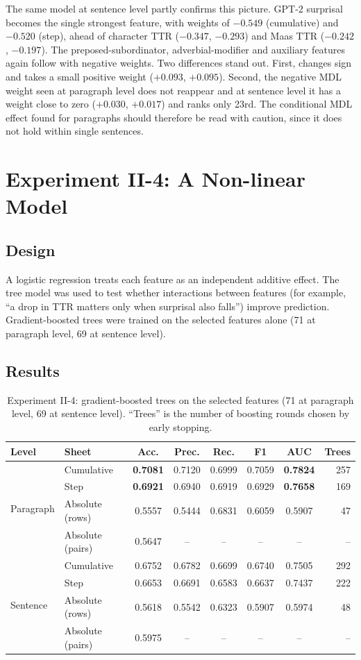 \documentclass[12pt,a4paper,oneside]{report}
\newcommand{\feat}[1]{\texttt{\detokenize{#1}}}
\begin{document}
The same model at sentence level partly confirms this picture. GPT-2 surprisal becomes the single strongest feature, with weights of $-0.549$ (cumulative) and $-0.520$ (step), ahead of character TTR ($-0.347$, $-0.293$) and Maas TTR ($-0.242$, $-0.197$). The preposed-subordinator, adverbial-modifier and auxiliary features again follow with negative weights. Two differences stand out. First, \feat{word_ttr} changes sign and takes a small positive weight ($+0.093$, $+0.095$). Second, the negative MDL weight seen at paragraph level does not reappear and at sentence level \feat{mean_mdl} it has a weight close to zero ($+0.030$, $+0.017$) and ranks only 23rd. The conditional MDL effect found for paragraphs should therefore be read with caution, since it does not hold within single sentences.

\section{Experiment II-4: A Non-linear Model}
\subsection{Design}
A logistic regression treats each feature as an independent additive effect. The tree model was used to test whether interactions between features (for example, ``a drop in TTR matters only when surprisal also falls'') improve prediction. Gradient-boosted trees were trained on the selected features alone (71 at paragraph level, 69 at sentence level).

\subsection{Results}
\begin{table}[ht]
\centering
\small
\caption[Experiment II-4: gradient-boosted trees]{Experiment II-4: gradient-boosted trees on the selected features (71 at paragraph level, 69 at sentence level). ``Trees'' is the number of boosting rounds chosen by early stopping.}
\label{tab:exp4}
\begin{tabular}{@{}llcccccr@{}}
\toprule
Level & Sheet & Acc. & Prec. & Rec. & F1 & AUC & Trees\\
\midrule
\multirow{4}{*}{Paragraph} & Cumulative & \textbf{0.7081} & 0.7120 & 0.6999 & 0.7059 & \textbf{0.7824} & 257\\
 & Step & \textbf{0.6921} & 0.6940 & 0.6919 & 0.6929 & \textbf{0.7658} & 169\\
 & Absolute (rows) & 0.5557 & 0.5444 & 0.6831 & 0.6059 & 0.5907 & 47\\
 & Absolute (pairs) & 0.5647 & -- & -- & -- & -- & --\\
\midrule
\multirow{4}{*}{Sentence} & Cumulative & 0.6752 & 0.6782 & 0.6699 & 0.6740 & 0.7505 & 292\\
 & Step & 0.6653 & 0.6691 & 0.6583 & 0.6637 & 0.7437 & 222\\
 & Absolute (rows) & 0.5618 & 0.5542 & 0.6323 & 0.5907 & 0.5974 & 48\\
 & Absolute (pairs) & 0.5975 & -- & -- & -- & -- & --\\
\bottomrule
\end{tabular}
\end{table}
\end{document}
